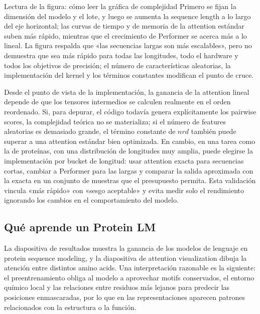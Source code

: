 \documentclass[a4paper]{article}
\begin{document}
\begin{knowledgebox}{Lectura de la figura: cómo leer la gráfica de complejidad}
Primero se fijan la dimensión del modelo y el lote, y luego se aumenta la sequence length a lo largo del eje horizontal; las curvas de tiempo y de memoria de la attention estándar suben más rápido, mientras que el crecimiento de Performer se acerca más a lo lineal. La figura respalda que «las secuencias largas son más escalables», pero no demuestra que sea más rápido para todas las longitudes, todo el hardware y todos los objetivos de precisión; el número de características aleatorias, la implementación del kernel y los términos constantes modifican el punto de cruce.
\end{knowledgebox}

Desde el punto de vista de la implementación, la ganancia de la attention lineal depende de que los tensores intermedios se calculen realmente en el orden reordenado. Si, para depurar, el código todavía genera explícitamente los pairwise scores, la complejidad teórica no se materializa; si el número de features aleatorias es demasiado grande, el término constante de $n r d$ también puede superar a una attention estándar bien optimizada. En cambio, en una tarea como la de proteínas, con una distribución de longitudes muy amplia, puede elegirse la implementación por bucket de longitud: usar attention exacta para secuencias cortas, cambiar a Performer para las largas y comparar la salida aproximada con la exacta en un conjunto de muestras que el presupuesto permita. Esta validación vincula «más rápido» con «sesgo aceptable» y evita medir solo el rendimiento ignorando los cambios en el comportamiento del modelo.


\subsection{Qué aprende un Protein LM}

La diapositiva de resultados muestra la ganancia de los modelos de lenguaje en protein sequence modeling, y la diapositiva de attention visualization dibuja la atención entre distintos amino acids. Una interpretación razonable es la siguiente: el preentrenamiento obliga al modelo a aprovechar motifs conservados, el entorno químico local y las relaciones entre residuos más lejanos para predecir las posiciones enmascaradas, por lo que en las representaciones aparecen patrones relacionados con la estructura o la función.
\end{document}

